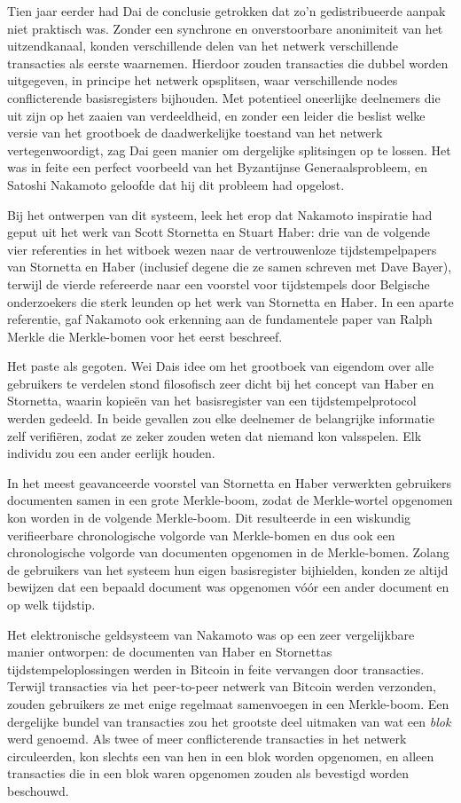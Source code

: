 \documentclass[
  a5paper,
  smalldemyvopaper,11pt,twoside,onecolumn,openright,extrafontsizes,
hidelinks]{memoir}
\begin{document}
Tien jaar eerder had Dai de conclusie getrokken dat zo'n gedistribueerde
aanpak niet praktisch was. Zonder een synchrone en onverstoorbare
anonimiteit van het uitzendkanaal, konden verschillende delen van het
netwerk verschillende transacties als eerste waarnemen. Hierdoor zouden
transacties die dubbel worden uitgegeven, in principe het netwerk
opsplitsen, waar verschillende nodes conflicterende basisregisters
bijhouden. Met potentieel oneerlijke deelnemers die uit zijn op het
zaaien van verdeeldheid, en zonder een leider die beslist welke versie
van het grootboek de daadwerkelijke toestand van het netwerk
vertegenwoordigt, zag Dai geen manier om dergelijke splitsingen op te
lossen. Het was in feite een perfect voorbeeld van het Byzantijnse
Generaalsprobleem, en Satoshi Nakamoto geloofde dat hij dit probleem had
opgelost.

Bij het ontwerpen van dit systeem, leek het erop dat Nakamoto inspiratie
had geput uit het werk van Scott Stornetta en Stuart Haber: drie van de
volgende vier referenties in het witboek wezen naar de vertrouwenloze
tijdstempelpapers van Stornetta en Haber (inclusief degene die ze samen
schreven met Dave Bayer), terwijl de vierde refereerde naar een voorstel
voor tijdstempels door Belgische onderzoekers die sterk leunden op het
werk van Stornetta en Haber. In een aparte referentie, gaf Nakamoto ook
erkenning aan de fundamentele paper van Ralph Merkle die Merkle-bomen
voor het eerst beschreef.

Het paste als gegoten. Wei Dais idee om het grootboek van eigendom over
alle gebruikers te verdelen stond filosofisch zeer dicht bij het concept
van Haber en Stornetta, waarin kopieën van het basisregister van een
tijdstempelprotocol werden gedeeld. In beide gevallen zou elke deelnemer
de belangrijke informatie zelf verifiëren, zodat ze zeker zouden weten
dat niemand kon valsspelen. Elk individu zou een ander eerlijk houden.

In het meest geavanceerde voorstel van Stornetta en Haber verwerkten
gebruikers documenten samen in een grote Merkle-boom, zodat de
Merkle-wortel opgenomen kon worden in de volgende Merkle-boom. Dit
resulteerde in een wiskundig verifieerbare chronologische volgorde van
Merkle-bomen en dus ook een chronologische volgorde van documenten
opgenomen in de Merkle-bomen. Zolang de gebruikers van het systeem hun
eigen basisregister bijhielden, konden ze altijd bewijzen dat een
bepaald document was opgenomen vóór een ander document en op welk
tijdstip.

Het elektronische geldsysteem van Nakamoto was op een zeer vergelijkbare
manier ontworpen: de documenten van Haber en Stornettas
tijdstempeloplossingen werden in Bitcoin in feite vervangen door
transacties. Terwijl transacties via het peer-to-peer netwerk van
Bitcoin werden verzonden, zouden gebruikers ze met enige regelmaat
samenvoegen in een Merkle-boom. Een dergelijke bundel van transacties
zou het grootste deel uitmaken van wat een \emph{blok} werd genoemd. Als
twee of meer conflicterende transacties in het netwerk circuleerden, kon
slechts een van hen in een blok worden opgenomen, en alleen transacties
die in een blok waren opgenomen zouden als bevestigd worden beschouwd.
\end{document}
